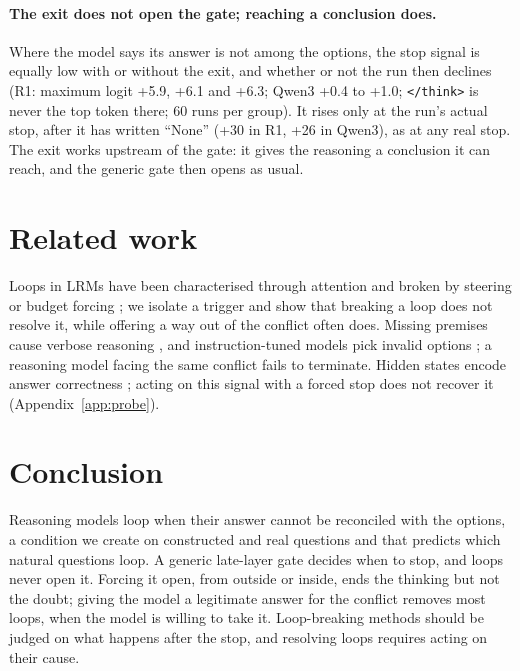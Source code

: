 \documentclass[11pt]{article}
\newcommand{\think}{\texttt{</think>}}
\begin{document}
\paragraph{The exit does not open the gate; reaching a conclusion does.} Where the model says its answer
is not among the options, the stop signal is equally low with or without the exit, and whether or not the
run then declines (R1: maximum logit +5.9, +6.1 and +6.3; Qwen3 +0.4 to +1.0; \think{} is never the top
token there; 60 runs per group). It rises only at the run's actual stop, after it has written ``None''
(+30 in R1, +26 in Qwen3), as at any real stop. The exit works upstream of the gate: it gives the
reasoning a conclusion it can reach, and the generic gate then opens as usual.

\section{Related work}
Loops in LRMs have been characterised through attention \citep{duan2026circular,zhang2026astray} and
broken by steering \citep{yu2026sophia} or budget forcing \citep{muennighoff2025s1}; we isolate a
trigger and show that breaking a loop does not resolve it, while offering a way out of the conflict
often does. Missing
premises cause verbose reasoning \citep{fan2025missing}, and instruction-tuned models pick invalid
options \citep{goral2025wait}; a reasoning model facing the same conflict fails to terminate. Hidden
states encode answer correctness \citep{zhang2025know}; acting on this signal with a forced stop does
not recover it (Appendix~\ref{app:probe}).

\section{Conclusion}
Reasoning models loop when their answer cannot be reconciled with the options, a condition we create on
constructed and real questions and that predicts which natural questions loop. A generic late-layer
gate decides when to stop, and loops never open it. Forcing it open, from outside or inside, ends the
thinking but not the doubt; giving the model a legitimate answer for the conflict removes most loops, when the model is willing to
take it.
Loop-breaking methods should be judged on what happens after the stop, and resolving loops requires
acting on their cause.
\end{document}
